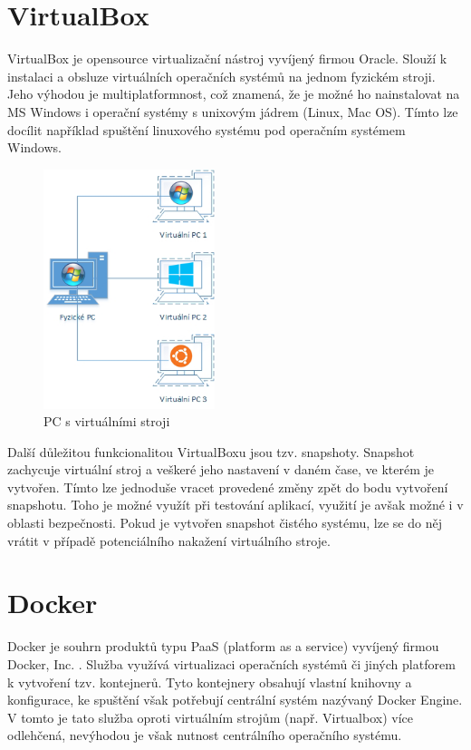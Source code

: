 \documentclass[thesis=M,czech,hidelinks]{FITthesis}[2013/05/06]
\begin{document}
\section{VirtualBox}\label{sec:virtualbox}
VirtualBox \cite{virutalbox} je opensource virtualizační nástroj vyvíjený firmou Oracle. Slouží k instalaci  a obsluze virtuálních operačních systémů na jednom fyzickém stroji. Jeho výhodou je multiplatformnost, což znamená, že je možné ho nainstalovat na MS Windows i operační systémy s unixovým jádrem (Linux, Mac OS). Tímto lze docílit například spuštění linuxového systému pod operačním systémem Windows.
\begin{figure}[h]
	\centering
	\includegraphics[width=5cm]{pictures/vbox.png}
	\caption{PC s virtuálními stroji \cite{vbox_pic}}
	\label{fig:vbox}
\end{figure}

Další důležitou funkcionalitou VirtualBoxu jsou tzv. snapshoty. Snapshot zachycuje virtuální stroj a veškeré jeho nastavení v daném čase, ve kterém je vytvořen. Tímto lze jednoduše vracet provedené změny zpět do bodu vytvoření snapshotu. Toho je možné využít při testování aplikací, využití je avšak možné i v oblasti bezpečnosti. Pokud je vytvořen snapshot čistého systému, lze se do něj vrátit v případě potenciálního nakažení virtuálního stroje.


\section{Docker}\label{sec:docker}
Docker je souhrn produktů typu PaaS (platform as a service) vyvíjený firmou Docker, Inc. \cite{docker}. Služba využívá virtualizaci operačních systémů či jiných platforem k vytvoření tzv. kontejnerů. Tyto kontejnery obsahují vlastní knihovny a konfigurace, ke spuštění však potřebují centrální systém nazývaný Docker Engine. V tomto je tato služba oproti virtuálním strojům (např. Virtualbox) více odlehčená, nevýhodou je však nutnost centrálního operačního systému. 
\end{document}
